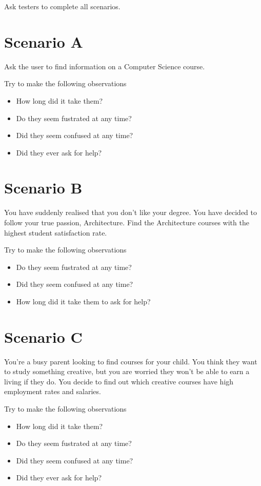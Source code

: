 \documentclass[11pt]{article} %
\begin{document}
Ask testers to complete all scenarios.
\section{Scenario A}
Ask the user to find information on a Computer Science course.

Try to make the following observations
\begin{itemize}
    \item How long did it take them?
    \item Do they seem fustrated at any time?
    \item Did they seem confused at any time?
    \item Did they ever ask for help?
\end{itemize}
\section{Scenario B}
You have suddenly realised that you don't like your degree. You have decided to follow your true passion, Architecture. Find the Architecture courses with the highest student satisfaction rate.

Try to make the following observations
\begin{itemize}
    \item Do they seem fustrated at any time?
    \item Did they seem confused at any time?
    \item How long did it take them to ask for help?
\end{itemize}
\section{Scenario C}
You're a busy parent looking to find courses for your child. You think they want to study something creative, but you are worried they won't be able to earn a living if they do. You decide to find out which creative courses have high employment rates and salaries.

Try to make the following observations
\begin{itemize}
    \item How long did it take them?
    \item Do they seem fustrated at any time?
    \item Did they seem confused at any time?
    \item Did they ever ask for help?
\end{itemize}
\end{document}
